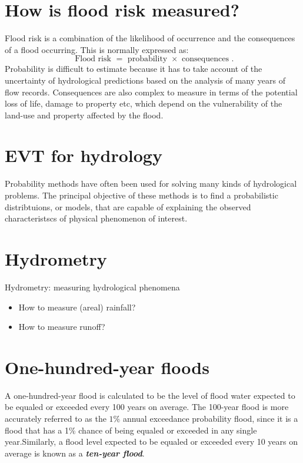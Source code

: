 \section{ How is flood risk measured?}
Flood risk is a combination of the likelihood of occurrence and the consequences of a flood occurring. This is normally expressed as:
\[ \mbox{ Flood risk } = \mbox{ probability } \times \mbox { consequences }.\]
Probability is difficult to estimate because it has to take account of the uncertainty of hydrological predictions based on the analysis of many years of flow records. Consequences are also complex to measure in terms of the
potential loss of life, damage to property etc, which depend on the vulnerability of the land-use and property affected by the flood.



\section{EVT for hydrology}
Probability methods have often been used for solving many kinds of hydrological problems. The principal objective of these methods is to find a probabilistic distribtuions, or models, that are capable of explaining the observed  characteristscs of physical phenomenon of interest.


\section{Hydrometry}
Hydrometry: measuring hydrological phenomena
\begin{itemize}
	\item How to measure (areal) rainfall?
	\item How to measure runoff?
\end{itemize}


\section{One-hundred-year floods }
A one-hundred-year flood is calculated to be the level of flood water expected to be equaled or exceeded every 100 years on average. The 100-year flood is more accurately referred to as the $1\%$ annual exceedance probability flood, since it is a flood that has a 1\% chance of being equaled or exceeded in any single
year.Similarly, a flood level expected to be equaled or exceeded every 10 years on average is known as a \textbf{\emph{ten-year
		flood}}.


